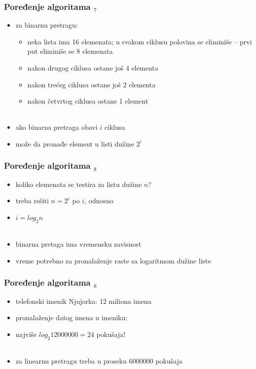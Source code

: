\documentclass[utf8,compress]{beamer}
\begin{document}
\begin{frame}[fragile]
  \frametitle{Poređenje algoritama $_7$}
  \begin{itemize}
    \item za binarnu pretragu:
    \begin{itemize}
      \item neka lista ima 16 elemenata; u svakom ciklusu polovina se 
        eliminiše -- prvi put eliminiše se 8 elemenata
      \item nakon drugog ciklusa ostane još 4 elementa
      \item nakon trećeg ciklusa ostane još 2 elementa
      \item nakon četvrtog ciklusa ostane 1 element \\ \ \\
    \end{itemize}
    \item ako binarna pretraga obavi $i$ ciklusa
    \item može da pronađe element u listi dužine $2^i$
  \end{itemize}
\end{frame}

\begin{frame}[fragile]
  \frametitle{Poređenje algoritama $_8$}
  \begin{itemize}
    \item koliko elemenata se testira za listu dužine $n$?
    \item treba rešiti $n = 2^i$ po $i$, odnosno
    \item $i = log_2 n$ \\ \ \\
    \item binarna pretaga ima  vremensku zavisnost
    \item vreme potrebno za pronalaženje raste sa logaritmom dužine liste
  \end{itemize}
\end{frame}

\begin{frame}[fragile]
  \frametitle{Poređenje algoritama $_8$}
  \begin{itemize}
    \item telefonski imenik Njujorka: 12 miliona imena
    \item pronalaženje datog imena u imeniku: 
    \item najviše $log_2 12000000 = 24$ pokušaja! \\ \ \\
    \item za linearnu pretragu treba u proseku 6000000 pokušaja
  \end{itemize}
\end{frame}
\end{document}
